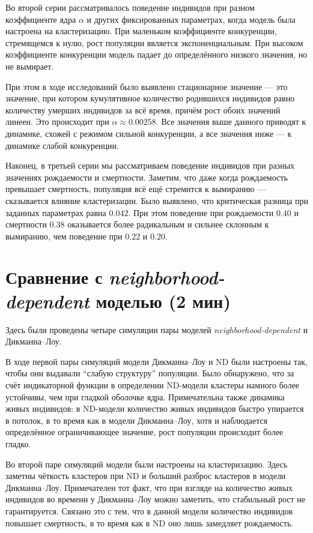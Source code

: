 \documentclass[12pt,a4paper]{article}
\begin{document}
Во второй серии рассматривалось поведение индивидов при разном коэффициенте ядра $\alpha$ и других фиксированных параметрах, когда модель была настроена на кластеризацию. При маленьком коэффициенте конкуренции, стремящемся к нулю, рост популяции является экспоненциальным. При высоком коэффициенте конкуренции модель падает до определённого низкого значения, но не вымирает.

При этом в ходе исследований было выявлено стационарное значение --- это значение, при котором кумулятивное количество родившихся индивидов равно количеству умерших индивидов за всё время, причём рост обоих значений линеен. Это происходит при $\alpha \approx 0.00258$. Все значения выше данного приводят к динамике, схожей с режимом сильной конкуренции, а все значения ниже --- к динамике слабой конкуренции.

Наконец, в третьей серии мы рассматриваем поведение индивидов при разных значениях рождаемости и смертности. Заметим, что даже когда рождаемость превышает смертность, популяция всё ещё стремится к вымиранию --- сказывается влияние кластеризации. Было выявлено, что критическая разница при заданных параметрах равна $0.042$. При этом поведение при рождаемости $0.40$ и смертности $0.38$ оказывается более радикальным и сильнее склонным к вымиранию, чем поведение при $0.22$ и $0.20$.

\section*{Сравнение с \textit{neighborhood-dependent} моделью (2 мин)}
Здесь были проведены четыре симуляции пары моделей \textit{neighborhood-dependent} и Дикманна--Лоу.

В ходе первой пары симуляций модели Дикманна--Лоу и ND были настроены так, чтобы они выдавали ``слабую структуру'' популяции. Было обнаружено, что за счёт индикаторной функции в определении ND-модели кластеры намного более устойчивы, чем при гладкой оболочке ядра. Примечательна также динамика живых индивидов: в ND-модели количество живых индивидов быстро упирается в потолок, в то время как в модели Дикманна--Лоу, хотя и наблюдается определённое ограничивающее значение, рост популяции происходит более гладко.

Во второй паре симуляций модели были настроены на кластеризацию. Здесь заметны чёткость кластеров при ND и больший разброс кластеров в модели Дикманна--Лоу. Примечателен тот факт, что при взгляде на количество живых индивидов во времени у Дикманна--Лоу можно заметить, что стабильный рост не гарантируется. Связано это с тем, что в данной модели количество индивидов повышает смертность, в то время как в ND оно лишь замедляет рождаемость.
\end{document}

